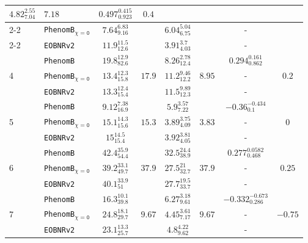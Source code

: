 \documentclass[12pt]{iopart}
\newcommand{\eob}{\texttt{EOBNRv2}\xspace}
\newcommand{\imr}{\texttt{PhenomB}\xspace}
\newcommand{\imrns}{\texttt{PhenomB$_\mathtt{\chi=0}$}\xspace}
\begin{document}
\begin{table}
\begin{tabular}{|l|l||c|c||c|c||c|c||}
$4.82^{2.55}_{7.04}$ & \multirow{3}{*}{$7.18$} & $0.497^{0.415}_{0.923}$ & 
\multirow{3}{*}{$0.4$} \\
    \cline{2-2}\cline{3-3} \cline{5-5} \cline{7-7}
& \imrns & $7.64^{6.83}_{9.16}$ & & $6.04^{5.04}_{6.75}$ & & - & \\
    \cline{2-2}\cline{3-3} \cline{5-5} \cline{7-7}
& \eob & $11.9^{11.5}_{12.6}$ & & $3.91^{3.7}_{4.03}$ & & - & \\
    \hline \hline
  \multirow{3}{*}{4} & \imr & $19.8^{12.9}_{82.6}$ & \multirow{3}{*}{$17.9$} & 
$8.26^{2.78}_{12.4}$ & \multirow{3}{*}{$8.95$} & $0.294^{0.161}_{0.862}$ & 
\multirow{3}{*}{$0.2$} \\
    \cline{2-2}\cline{3-3} \cline{5-5} \cline{7-7}
& \imrns & $13.4^{12.3}_{15.8}$ & & $11.2^{9.46}_{12.2}$ & & - & \\
    \cline{2-2}\cline{3-3} \cline{5-5} \cline{7-7}
& \eob & $13.3^{12.4}_{15.4}$ & & $11.5^{9.89}_{12.3}$ & & - & \\
    \hline \hline
  \multirow{3}{*}{5} & \imr & $9.12^{7.38}_{16.9}$ & \multirow{3}{*}{$15.3$} & 
$5.9^{3.57}_{7.22}$ & \multirow{3}{*}{$3.83$} & $-0.36^{-0.434}_{0.1}$ & 
\multirow{3}{*}{$0$} \\
    \cline{2-2}\cline{3-3} \cline{5-5} \cline{7-7}
& \imrns & $15.1^{14.3}_{15.6}$ & & $3.89^{3.75}_{4.09}$ & & - & \\
    \cline{2-2}\cline{3-3} \cline{5-5} \cline{7-7}
& \eob & $15^{14.5}_{15.4}$ & & $3.92^{3.81}_{4.05}$ & & - & \\
    \hline \hline
  \multirow{3}{*}{6} & \imr & $42.4^{35.9}_{54.4}$ & \multirow{3}{*}{$37.9$} & 
$32.5^{24.4}_{38.9}$ & \multirow{3}{*}{$37.9$} & $0.277^{0.0582}_{0.468}$ & 
\multirow{3}{*}{$0.25$} \\
    \cline{2-2}\cline{3-3} \cline{5-5} \cline{7-7}
& \imrns & $39.2^{33.1}_{49.7}$ & & $27.5^{21}_{32.7}$ & & - & \\
    \cline{2-2}\cline{3-3} \cline{5-5} \cline{7-7}
& \eob & $40.1^{33.9}_{51}$ & & $27.7^{19.5}_{33.7}$ & & - & \\
    \hline \hline
  \multirow{3}{*}{7} & \imr & $16.3^{10.1}_{39.8}$ & \multirow{3}{*}{$9.67$} & 
$6.27^{3.18}_{9.61}$ & \multirow{3}{*}{$9.67$} & $-0.332^{-0.673}_{0.286}$ & 
\multirow{3}{*}{$-0.75$} \\
    \cline{2-2}\cline{3-3} \cline{5-5} \cline{7-7}
& \imrns & $24.8^{18.1}_{29.7}$ & & $4.45^{3.61}_{7.17}$ & & - & \\
    \cline{2-2}\cline{3-3} \cline{5-5} \cline{7-7}
& \eob & $23.1^{13.3}_{25.7}$ & & $4.8^{4.22}_{9.62}$ & & - & \\
    \hline 
  \end{tabular}
\end{table}
\end{document}
